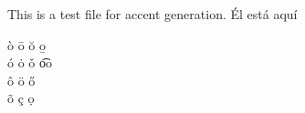 \documentclass{article}
\begin{document}
\noindent This is a test file for accent generation.
\'{E}l est\'{a} aqu\'{i}

\noindent \`o
\=o
\u o
\b o
\\
\'o
\.o
\v o
\t oo
\\
\^o
\"o
\H o
\\
\~o
\c c
\d o
  
\end{document}

